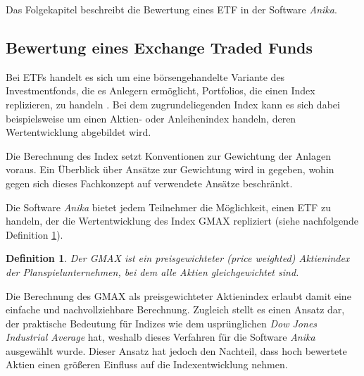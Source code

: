 \documentclass[12pt, a4paper]{article}
\theoremstyle{plain}
\newtheorem{definition}{Definition}
\begin{document}

 
Das Folgekapitel beschreibt die Bewertung eines \gls{ETF} in der Software \textit{Anika}.

\subsection{Bewertung eines Exchange Traded Funds}
\label{sec:bewertung_eines_exchange_traded_funds}

Bei \glspl{ETF} handelt es sich um eine börsengehandelte Variante des Investmentfonds, die es Anlegern ermöglicht, Portfolios, die einen Index replizieren, zu handeln \autocite[][S.~103]{bodie_investments_2018}. Bei dem zugrundeliegenden Index kann es sich dabei beispielsweise um einen Aktien- oder Anleihenindex handeln, deren Wertentwicklung abgebildet wird.

Die Berechnung des Index setzt Konventionen zur Gewichtung der Anlagen voraus. Ein Überblick über Ansätze zur Gewichtung wird in \textcite[][S.~44~ff.]{bodie_investments_2018} gegeben, wohin gegen sich dieses Fachkonzept auf verwendete Ansätze beschränkt.

Die Software \textit{Anika} bietet jedem Teilnehmer die Möglichkeit, einen ETF zu handeln, der die Wertentwicklung des Index \gls{GMAX} repliziert (siehe nachfolgende Definition \ref{def:gmax}).

\begin{definition}
	\label{def:gmax}
	Der \gls{GMAX} ist ein preisgewichteter (\textit{price weighted}) Aktienindex der Planspielunternehmen, bei dem alle Aktien gleichgewichtet sind.
\end{definition}

Die Berechnung des \gls{GMAX} als preisgewichteter Aktienindex erlaubt damit eine einfache und nachvollziehbare Berechnung. Zugleich stellt es einen Ansatz dar, der praktische Bedeutung für Indizes wie dem usprünglichen \textit{Dow Jones Industrial Average} hat, weshalb dieses Verfahren für die Software \textit{Anika} ausgewählt wurde. Dieser Ansatz hat jedoch den Nachteil, dass hoch bewertete Aktien einen größeren Einfluss auf die Indexentwicklung nehmen.
\end{document}
